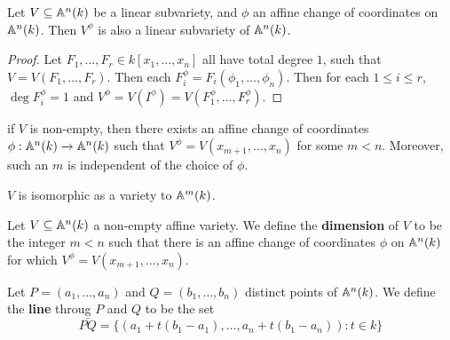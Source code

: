 \begin{lemma}\label{lemma_2.2.4}
  Let $V \subseteq \mathbb{A}^n(k)$ be a linear subvariety, and $\phi$ an affine change
  of coordinates on $\mathbb{A}^n(k)$. Then $V^\phi$ is also a linear subvariety of
  $\mathbb{A}^n(k)$.
\end{lemma}
\begin{proof}
  Let $F_1, \dots, F_r \in k[x_1, \dots, x_n]$ all have total degree $1$, such
  that $V=V(F_1, \dots, F_r)$. Then each $F_i^\phi=F_i(\phi_1, \dots, \phi_n)$.
  Then for each $1 \leq i \leq r$, $\deg{F_i^\phi}=1$ and $V^\phi=V(I^\phi)=
  V(F_1^\phi, \dots, F_r^\phi)$.
\end{proof}
\begin{corollary}
  if $V$ is non-empty, then there exists an affine change of coordinates
  $\phi:\mathbb{A}^n(k) \xrightarrow{} \mathbb{A}^n(k)$ such that $V^\phi=V(x_{m+1}, \dots,
  x_n)$ for some $m<n$. Moreover, such an $m$ is independent of the choice of
  $\phi$.
\end{corollary}
\begin{corollary}
  $V$ is isomorphic as a variety to  $\mathbb{A}^m(k)$.
\end{corollary}

\begin{definition}
  Let $V \subseteq \mathbb{A}^n(k)$ a non-empty affine variety. We define the
  \textbf{dimension} of $V$ to be the integer $m<n$ such that there is an affine
  change of coordinates $\phi$ on $\mathbb{A}^n(k)$ for which $V^\phi=V(x_{m+1}, \dots,
  x_n)$.
\end{definition}

\begin{example}\label{example_2.2}
  Let $P=(a_1, \dots, a_n)$ and $Q=(b_1, \dots, b_n)$ distinct points of
  $\mathbb{A}^n(k)$. We define the \textbf{line} throug $P$ and $Q$ to be the set
  \begin{equation*}
    \bar{PQ}=\{(a_1+t(b_1-a_1), \dots, a_n+t(b_1-a_n)) : t \in k\}
  \end{equation*}
\end{example}

